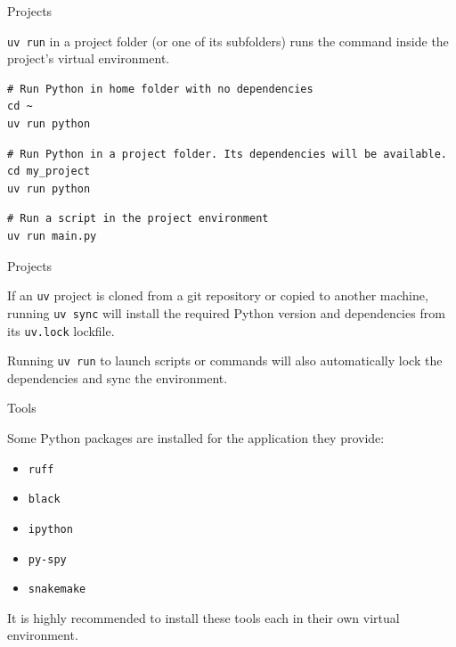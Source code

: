 \documentclass[aspectratio=169,xcolor=dvipsnames,svgnames,x11names,fleqn]{beamer}
\begin{document}
\begin{frame}[containsverbatim]{Projects}

    \texttt{uv run} in a project folder (or one of its subfolders) runs the command inside the project's virtual environment.

    \begin{verbatim}
# Run Python in home folder with no dependencies
cd ~
uv run python
    \end{verbatim}

    \begin{verbatim}
# Run Python in a project folder. Its dependencies will be available.
cd my_project
uv run python
    \end{verbatim}

    \begin{verbatim}
# Run a script in the project environment
uv run main.py
    \end{verbatim}

\end{frame}

\begin{frame}{Projects}

    If an \texttt{uv} project is cloned from a git repository or copied to another machine, running \texttt{uv sync} will install the required Python version and dependencies from its \texttt{uv.lock} lockfile.

    \bigskip
    Running \texttt{uv run} to launch scripts or commands will also automatically lock the dependencies and sync the environment.

\end{frame}

\begin{frame}{Tools}

    Some Python packages are installed for the application they provide:
    \begin{itemize}
        \item \texttt{ruff}
        \item \texttt{black}
        \item \texttt{ipython}
        \item \texttt{py-spy}
        \item \texttt{snakemake}
    \end{itemize}

    \bigskip
    It is highly recommended to install these tools each in their own virtual environment.

\end{frame}
\end{document}
